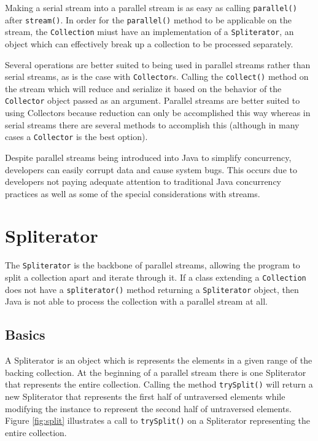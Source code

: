 \documentclass[oneside, a4paper, 11pt]{article}
\begin{document}
Making a serial stream into a parallel stream is as easy as calling \verb|parallel()| after \verb|stream()|. In order for the \verb|parallel()| method to be applicable on the stream, the \verb|Collection| miust have an implementation of a \verb|Spliterator|, an object which can effectively break up a collection to be processed separately. 

Several operations are better suited to being used in parallel streams rather than serial streams, as is the case with \verb|Collector|s. Calling the \verb|collect()| method on the stream which will reduce and serialize it based on the behavior of the \verb|Collector| object passed as an argument. Parallel streams are better suited to using Collectors because reduction can only be accomplished this way whereas in serial streams there are several methods to accomplish this (although in many cases a \verb|Collector| is the best option).

Despite parallel streams being introduced into Java to simplify concurrency, developers can easily corrupt data and cause system bugs. This occurs due to developers not paying adequate attention to traditional Java concurrency practices as well as some of the special considerations with streams. %
\section{Spliterator}
The \verb|Spliterator| is the backbone of parallel streams, allowing the program to split a collection apart and iterate through it. If a class extending a \verb|Collection| does not have a \verb|spliterator()| method returning a \verb|Spliterator| object, then Java is not able to process the collection with a parallel stream at all.

\subsection{Basics}
A Spliterator is an object which is represents the elements in a given range of the backing collection. At the beginning of a parallel stream there is one Spliterator that represents the entire collection. Calling the method \verb|trySplit()| will return a new Spliterator that represents the first half of untraversed elements while modifying the instance to represent the second half of untraversed elements. Figure \ref{fig:split} illustrates a call to \verb|trySplit()| on a Spliterator representing the entire collection.
\end{document}
